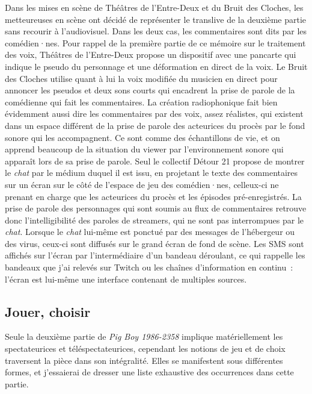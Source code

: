 \documentclass[
]{article}
\begin{document}
Dans les mises en scène de Théâtres de l'Entre-Deux et du Bruit des Cloches, les metteureuses en scène ont décidé de représenter le translive de la deuxième partie sans recourir à l'audiovisuel. Dans les deux cas, les commentaires sont dits par les comédien·nes. Pour rappel de la première partie de ce mémoire sur le traitement des voix, Théâtres de l'Entre-Deux propose un dispositif avec une pancarte qui indique le pseudo du personnage et une déformation en direct de la voix. Le Bruit des Cloches utilise quant à lui la voix modifiée du musicien en direct pour annoncer les pseudos et deux sons courts qui encadrent la prise de parole de la comédienne qui fait les commentaires. La création radiophonique fait bien évidemment aussi dire les commentaires par des voix, assez réalistes, qui existent dans un espace différent de la prise de parole des acteurices du procès par le fond sonore qui les accompagnent. Ce sont comme des échantillons de vie, et on apprend beaucoup de la situation du viewer par l'environnement sonore qui apparaît lors de sa prise de parole. Seul le collectif Détour 21 propose de montrer le \emph{chat }par le médium duquel il est issu, en projetant le texte des commentaires sur un écran sur le côté de l'espace de jeu des comédien·nes, celleux-ci ne prenant en charge que les acteurices du procès et les épisodes pré-enregistrés. La prise de parole des personnages qui sont soumis au flux de commentaires retrouve donc l'intelligibilité des paroles de streamers, qui ne sont pas interrompues par le \emph{chat}. Lorsque le \emph{chat} lui-même est ponctué par des messages de l'hébergeur ou des virus, ceux-ci sont diffusés sur le grand écran de fond de scène. Les SMS sont affichés sur l'écran par l'intermédiaire d'un bandeau déroulant, ce qui rappelle les bandeaux que j'ai relevés sur Twitch ou les chaînes d'information en continu~: l'écran est lui-même une interface contenant de multiples sources.

\subsection{Jouer, choisir}\label{jouer-choisir}

Seule la deuxième partie de \emph{Pig Boy 1986-2358} implique matériellement les spectateurices et téléspectateurices, cependant les notions de jeu et de choix traversent la pièce dans son intégralité. Elles se manifestent sous différentes formes, et j'essaierai de dresser une liste exhaustive des occurrences dans cette partie.
\end{document}
